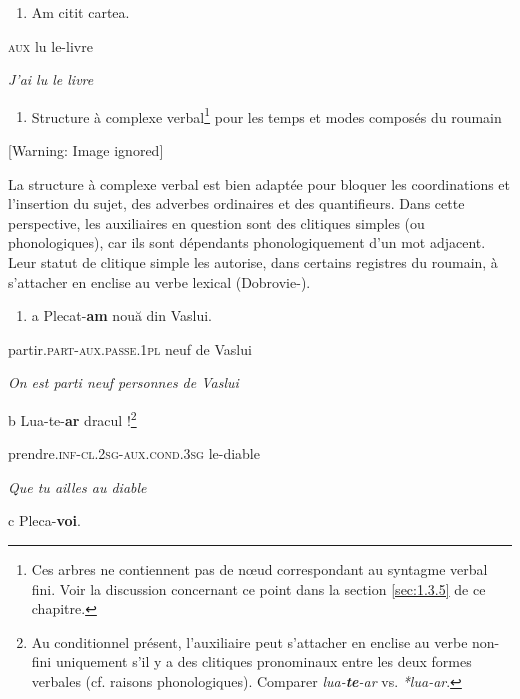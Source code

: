 \begin{enumerate}
\item \label{bkm:Ref299284113}Am citit cartea.


\end{enumerate}
  \textsc{aux} lu\textsc{ } le-livre

  \textit{J'ai lu le livre}    


\begin{enumerate}
\item \label{bkm:Ref299284150}Structure à complexe verbal\footnote{Ces arbres ne contiennent pas de n{\oe}ud correspondant au syntagme verbal fini. Voir la discussion concernant ce point dans la section \ref{sec:1.3.5} de ce chapitre.}  pour les temps et modes composés du roumain


\end{enumerate}
{   [Warning: Image ignored] %
} 

La structure à complexe verbal est bien adaptée pour bloquer les coordinations et l'insertion du sujet, des adverbes ordinaires et des quantifieurs. Dans cette perspective, les auxiliaires en question sont des clitiques simples (ou phonologiques), car ils sont dépendants phonologiquement d'un mot adjacent. Leur statut de clitique simple les autorise, dans certains registres du roumain, à s'attacher en enclise au verbe lexical (Dobrovie-\citet{Sorin1994}).  


\begin{enumerate}
\item a  Plecat-\textbf{am}       nouă din Vaslui.


\end{enumerate}
partir.\textsc{part-aux.passe.1pl} neuf  de  Vaslui

{\itshape
On est parti neuf personnes de Vaslui } 

  b  Lua-te-\textbf{ar}         dracul !\footnote{Au conditionnel présent, l'auxiliaire peut s'attacher en enclise au verbe non-fini uniquement s'il y a des clitiques pronominaux entre les deux formes verbales (cf. raisons phonologiques). Comparer \textit{lua-}\textbf{\textit{te}}\textit{-ar} vs. \textit{*lua-ar}.}~

    prendre.\textsc{inf}-\textsc{cl.2sg-aux.cond.3sg} le-diable

{\itshape
    Que tu ailles au diable}

  c  Pleca-\textbf{voi}.~

